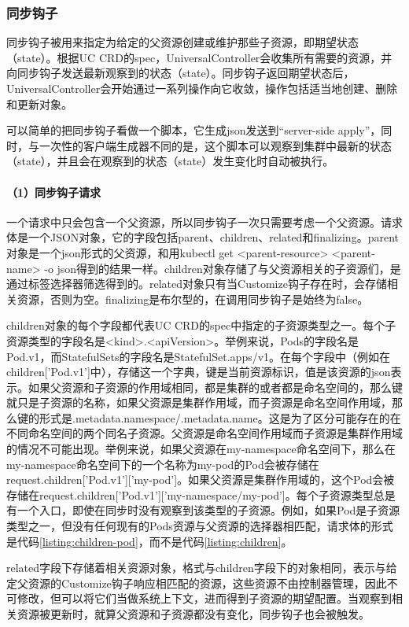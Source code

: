 \documentclass[macfonts,master]{njuthesis}
\begin{document}
\subsubsection{同步钩子}

同步钩子被用来指定为给定的父资源创建或维护那些子资源，即期望状态（state）。根据UC CRD的spec，UniversalController会收集所有需要的资源，并向同步钩子发送最新观察到的状态（state）。同步钩子返回期望状态后，UniversalController会开始通过一系列操作向它收敛，操作包括适当地创建、删除和更新对象。

可以简单的把同步钩子看做一个脚本，它生成json发送到``server-side apply''，同时，与一次性的客户端生成器不同的是，这个脚本可以观察到集群中最新的状态（state），并且会在观察到的状态（state）发生变化时自动被执行。

\paragraph{（1）同步钩子请求}
一个请求中只会包含一个父资源，所以同步钩子一次只需要考虑一个父资源。请求体是一个JSON对象，它的字段包括parent、children、related和finalizing。parent对象是一个json形式的父资源，和用kubectl get <parent-resource> <parent-name> -o json得到的结果一样。children对象存储了与父资源相关的子资源们，是通过标签选择器筛选得到的。related对象只有当Customize钩子存在时，会存储相关资源，否则为空。finalizing是布尔型的，在调用同步钩子是始终为false。

children对象的每个字段都代表UC CRD的spec中指定的子资源类型之一。每个子资源类型的字段名是<kind>.<apiVersion>。举例来说，Pods的字段名是Pod.v1，而StatefulSets的字段名是StatefulSet.apps/v1。在每个字段中（例如在children['Pod.v1']中），存储这一个字典，键是当前资源标识，值是该资源的json表示。如果父资源和子资源的作用域相同，都是集群的或者都是命名空间的，那么键就只是子资源的名称，如果父资源是集群作用域，而子资源是命名空间作用域，那么键的形式是{.metadata.namespace}/{.metadata.name}。这是为了区分可能存在的在不同命名空间的两个同名子资源。父资源是命名空间作用域而子资源是集群作用域的情况不可能出现。举例来说，如果父资源在my-namespace命名空间下，那么在my-namespace命名空间下的一个名称为my-pod的Pod会被存储在request.children['Pod.v1']['my-pod']。如果父资源是集群作用域的，这个Pod会被存储在request.children['Pod.v1']['my-namespace/my-pod']。每个子资源类型总是有一个入口，即使在同步时没有观察到该类型的子资源。例如，如果Pod是子资源类型之一，但没有任何现有的Pods资源与父资源的选择器相匹配，请求体的形式是代码\ref{listing:children-pod}，而不是代码\ref{listing:children}。

related字段下存储着相关资源对象，格式与children字段下的对象相同，表示与给定父资源的Customize钩子响应相匹配的资源，这些资源不由控制器管理，因此不可修改，但可以将它们当做系统上下文，进而得到子资源的期望配置。当观察到相关资源被更新时，就算父资源和子资源都没有变化，同步钩子也会被触发。
\end{document}
